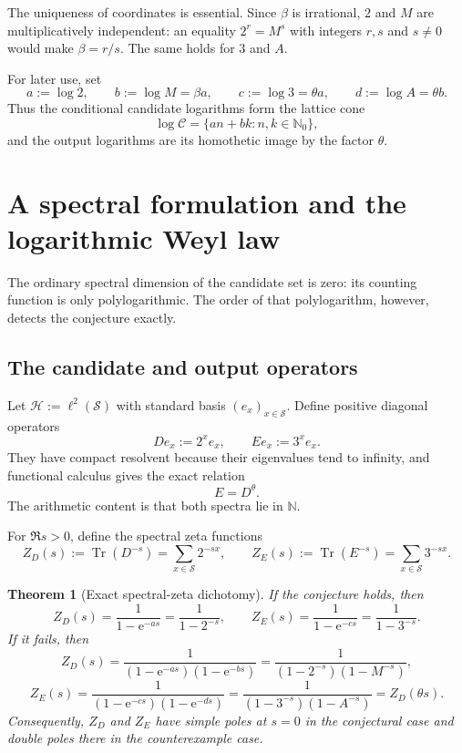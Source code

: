 \documentclass[11pt,oneside]{article}
\newtheorem{theorem}{Theorem}[section]
\theoremstyle{definition}
\theoremstyle{remark}
\newcommand{\N}{\mathbb N}
\newcommand{\Nzero}{\mathbb N_0}
\newcommand{\Sol}{\mathcal S}
\newcommand{\Cand}{\mathcal C}
\newcommand{\Tr}{\operatorname{Tr}}
\newcommand{\e}{\mathrm e}
\begin{document}
The uniqueness of coordinates is essential.  Since $\beta$ is irrational, $2$ and $M$ are multiplicatively independent: an equality $2^r=M^s$ with integers $r,s$ and $s\ne0$ would make $\beta=r/s$.  The same holds for $3$ and $A$.

For later use, set
\[
  a:=\log2,\qquad b:=\log M=\beta a,
  \qquad c:=\log3=\theta a,\qquad d:=\log A=\theta b.
\]
Thus the conditional candidate logarithms form the lattice cone
\[
  \log\Cand=\{an+bk:n,k\in\Nzero\},
\]
and the output logarithms are its homothetic image by the factor $\theta$.

\section{A spectral formulation and the logarithmic Weyl law}
\label{sec:spectral}

The ordinary spectral dimension of the candidate set is zero: its counting function is only polylogarithmic.  The order of that polylogarithm, however, detects the conjecture exactly.

\subsection{The candidate and output operators}

Let $\mathscr H:=\ell^2(\Sol)$ with standard basis $(e_x)_{x\in\Sol}$.  Define positive diagonal operators
\[
  D e_x:=2^x e_x,
  \qquad
  E e_x:=3^x e_x.
\]
They have compact resolvent because their eigenvalues tend to infinity, and functional calculus gives the exact relation
\begin{equation}
  E=D^\theta.
  \label{eq:E-Dtheta}
\end{equation}
The arithmetic content is that both spectra lie in $\N$.

For $\Re s>0$, define the spectral zeta functions
\[
  Z_D(s):=\Tr(D^{-s})=\sum_{x\in\Sol}2^{-sx},
  \qquad
  Z_E(s):=\Tr(E^{-s})=\sum_{x\in\Sol}3^{-sx}.
\]

\begin{theorem}[Exact spectral-zeta dichotomy]
\label{thm:zeta-dichotomy}
If the conjecture holds, then
\begin{equation}
  Z_D(s)=\frac1{1-\e^{-as}}=\frac1{1-2^{-s}},
  \qquad
  Z_E(s)=\frac1{1-\e^{-cs}}=\frac1{1-3^{-s}}.
  \label{eq:zeta-rank-one}
\end{equation}
If it fails, then
\begin{equation}
  Z_D(s)=\frac1{(1-\e^{-as})(1-\e^{-bs})}
       =\frac1{(1-2^{-s})(1-M^{-s})},
  \label{eq:zeta-rank-two-D}
\end{equation}
\begin{equation}
  Z_E(s)=\frac1{(1-\e^{-cs})(1-\e^{-ds})}
       =\frac1{(1-3^{-s})(1-A^{-s})}
       =Z_D(\theta s).
  \label{eq:zeta-rank-two-E}
\end{equation}
Consequently, $Z_D$ and $Z_E$ have simple poles at $s=0$ in the conjectural case and double poles there in the counterexample case.
\end{theorem}
\end{document}

